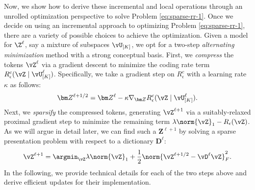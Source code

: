 \documentclass[../../book-main.tex]{subfiles}
\begin{document}
Now, we show how to derive these incremental and local operations through an unrolled optimization perspective to solve Problem \eqref{eq:sparse-rr-1}.  Once we decide on using an incremental approach to optimizing Problem
\eqref{eq:sparse-rr-1}, there are a variety of possible choices to achieve the optimization. Given a model for $\Z^\ell$, say a mixture of subspaces $\vU_{[K]}$, we opt for a two-step \textit{alternating minimization} method with a strong conceptual basis. First, we \textit{compress} the tokens $\vZ^{\ell}$ via a gradient descent to minimize the coding rate term $R^c_\epsilon (\vZ \mid \vU_{[K]}^\ell)$. Specifically, we take a gradient step on $R^c_\epsilon$ with a learning rate $\kappa$ as follows:
\begin{align}\label{eq:Z l+1/2}
    \bm Z^{\ell+1/2} = \bm Z^\ell - \kappa \nabla_{\bm Z} R^c_\epsilon (\vZ \mid \vU_{[K]}^\ell). 
\end{align}
Next, we \textit{sparsify} the compressed tokens, generating \(\vZ^{\ell + 1}\) via a suitably-relaxed proximal gradient step to minimize the remaining term $\lambda \norm{\vZ}_{1} - R_{\epsilon}(\vZ)$. As we will argue in detail later, we can find such a $\bm Z^{\ell+1}$ by solving a sparse presentation problem with respect to a dictionary $\bm D^\ell$:
\begin{equation}\label{eq:Z l+1}
  \vZ^{\ell+1} = \argmin_{{\vZ}}  \lambda \norm{\vZ}_1 + \frac{1}{2}\norm{\vZ^{\ell + 1/2} - \vD^{\ell} {\vZ}}_F^2.
\end{equation}
In the following, we provide technical details for each of the two steps above and derive efficient updates for their implementation.
\end{document}
